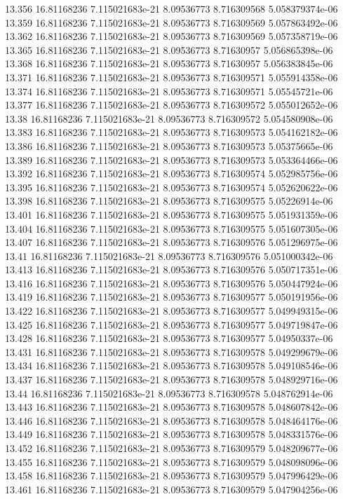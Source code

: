 {13.356 16.81168236 7.115021683e-21 8.09536773 8.716309568 5.058379374e-06
13.359 16.81168236 7.115021683e-21 8.09536773 8.716309569 5.057863492e-06
13.362 16.81168236 7.115021683e-21 8.09536773 8.716309569 5.057358719e-06
13.365 16.81168236 7.115021683e-21 8.09536773 8.71630957 5.056865398e-06
13.368 16.81168236 7.115021683e-21 8.09536773 8.71630957 5.056383845e-06
13.371 16.81168236 7.115021683e-21 8.09536773 8.716309571 5.055914358e-06
13.374 16.81168236 7.115021683e-21 8.09536773 8.716309571 5.05545721e-06
13.377 16.81168236 7.115021683e-21 8.09536773 8.716309572 5.055012652e-06
13.38 16.81168236 7.115021683e-21 8.09536773 8.716309572 5.054580908e-06
13.383 16.81168236 7.115021683e-21 8.09536773 8.716309573 5.054162182e-06
13.386 16.81168236 7.115021683e-21 8.09536773 8.716309573 5.05375665e-06
13.389 16.81168236 7.115021683e-21 8.09536773 8.716309573 5.053364466e-06
13.392 16.81168236 7.115021683e-21 8.09536773 8.716309574 5.052985756e-06
13.395 16.81168236 7.115021683e-21 8.09536773 8.716309574 5.052620622e-06
13.398 16.81168236 7.115021683e-21 8.09536773 8.716309575 5.05226914e-06
13.401 16.81168236 7.115021683e-21 8.09536773 8.716309575 5.051931359e-06
13.404 16.81168236 7.115021683e-21 8.09536773 8.716309575 5.051607305e-06
13.407 16.81168236 7.115021683e-21 8.09536773 8.716309576 5.051296975e-06
13.41 16.81168236 7.115021683e-21 8.09536773 8.716309576 5.051000342e-06
13.413 16.81168236 7.115021683e-21 8.09536773 8.716309576 5.050717351e-06
13.416 16.81168236 7.115021683e-21 8.09536773 8.716309576 5.050447924e-06
13.419 16.81168236 7.115021683e-21 8.09536773 8.716309577 5.050191956e-06
13.422 16.81168236 7.115021683e-21 8.09536773 8.716309577 5.049949315e-06
13.425 16.81168236 7.115021683e-21 8.09536773 8.716309577 5.049719847e-06
13.428 16.81168236 7.115021683e-21 8.09536773 8.716309577 5.04950337e-06
13.431 16.81168236 7.115021683e-21 8.09536773 8.716309578 5.049299679e-06
13.434 16.81168236 7.115021683e-21 8.09536773 8.716309578 5.049108546e-06
13.437 16.81168236 7.115021683e-21 8.09536773 8.716309578 5.048929716e-06
13.44 16.81168236 7.115021683e-21 8.09536773 8.716309578 5.048762914e-06
13.443 16.81168236 7.115021683e-21 8.09536773 8.716309578 5.048607842e-06
13.446 16.81168236 7.115021683e-21 8.09536773 8.716309578 5.048464176e-06
13.449 16.81168236 7.115021683e-21 8.09536773 8.716309578 5.048331576e-06
13.452 16.81168236 7.115021683e-21 8.09536773 8.716309579 5.048209677e-06
13.455 16.81168236 7.115021683e-21 8.09536773 8.716309579 5.048098096e-06
13.458 16.81168236 7.115021683e-21 8.09536773 8.716309579 5.047996429e-06
13.461 16.81168236 7.115021683e-21 8.09536773 8.716309579 5.047904256e-06
}
